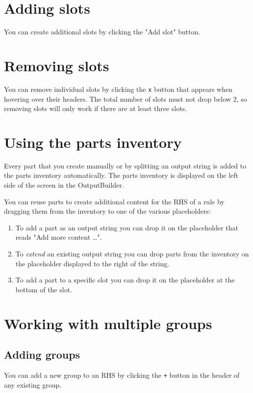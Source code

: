 \documentclass[11pt]{article}
\begin{document}
\section{Adding slots}
\label{sec-16}
You can create additional slots by clicking the "Add slot" button.

\section{Removing slots}
\label{sec-17}
You can remove individual slots by clicking the \texttt{x} button that
appears when hovering over their headers. The total number of slots
must not drop below 2, so removing slots will only work if there are
at least three slots.

\section{Using the parts inventory}
\label{sec-18}



Every part that you create manually or by splitting an output string
is added to the parts inventory automatically. The parts inventory
is displayed on the left side of the screen in the OutputBuilder.

You can reuse parts to create additional content for the RHS of a
rule by dragging them from the inventory to one of the various
placeholders:

\begin{enumerate}
\item To add a part as an output string you can drop it on the
placeholder that reads "Add more content \ldots{}".

\item To \emph{extend} an existing output string you can drop parts from
the inventory on the placeholder displayed to the right of the
string.

\item To add a part to a specific slot you can drop it on the
placeholder at the bottom of the slot.
\end{enumerate}

\section{Working with multiple groups}
\label{sec-19}
\subsection{Adding groups}
\label{sec-19-1}
You can add a new group to an RHS by clicking the \texttt{+} button in the
header of any existing group.
\end{document}
